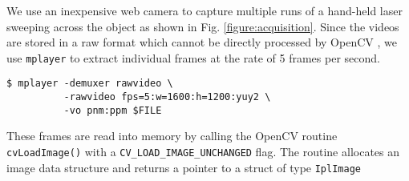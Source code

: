 We use an inexpensive web camera to capture multiple runs of a hand-held
laser sweeping across the object as shown in Fig. \ref{figure:acquisition}.
Since the videos are stored in a raw format which cannot be directly processed
by OpenCV \cite{bradski:2008}, we use \texttt{mplayer} to extract individual
frames at the rate of 5 frames per second.

\begin{verbatim}
$ mplayer -demuxer rawvideo \
          -rawvideo fps=5:w=1600:h=1200:yuy2 \
          -vo pnm:ppm $FILE
\end{verbatim}

These frames are read into memory by calling the OpenCV routine
\texttt{cvLoadImage()} with a \texttt{CV\_LOAD\_IMAGE\_UNCHANGED} flag. The
routine allocates an image data structure and returns a pointer to a struct of
type \texttt{IplImage}
